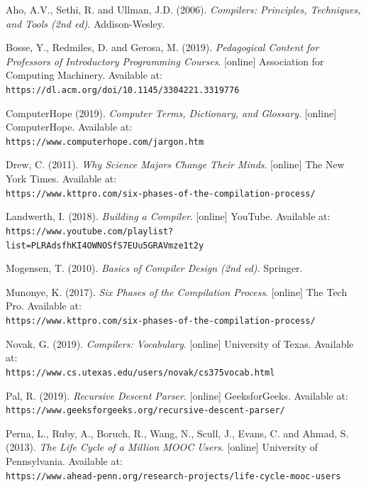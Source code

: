 \documentclass[
]{report}
\begin{document}
\begin{thebibliography}{9}
	Aho, A.V., Sethi, R. and Ullman, J.D. (2006).
	\textit{Compilers: Principles, Techniques, and Tools (2nd ed)}. 
	Addison-Wesley.
	
	Bosse, Y., Redmiles, D. and Gerosa, M. (2019).
	\textit{Pedagogical Content for Professors of Introductory Programming Courses}.
	[online] Association for Computing Machinery. Available at:
	\\\texttt{https://dl.acm.org/doi/10.1145/3304221.3319776}
	
	ComputerHope (2019).
	\textit{Computer Terms, Dictionary, and Glossary}.
	[online] ComputerHope. Available at:
	\\\texttt{https://www.computerhope.com/jargon.htm}
	
	Drew, C. (2011).
	\textit{Why Science Majors Change Their Minds}.
	[online] The New York Times. Available at:
	\\\texttt{https://www.kttpro.com/six-phases-of-the-compilation-process/}
	
	Landwerth, I. (2018).
	\textit{Building a Compiler}.
	[online] YouTube. Available at:
	\\\texttt{https://www.youtube.com/playlist?list=PLRAdsfhKI4OWNOSfS7EUu5GRAVmze1t2y}
	
	Mogensen, T. (2010).
	\textit{Basics of Compiler Design (2nd ed)}.
	Springer.
	
	Munonye, K. (2017).
	\textit{Six Phases of the Compilation Process}.
	[online] The Tech Pro. Available at:
	\\\texttt{https://www.kttpro.com/six-phases-of-the-compilation-process/}
	
	Novak, G. (2019).
	\textit{Compilers: Vocabulary}.
	[online] University of Texas. Available at:
	\\\texttt{https://www.cs.utexas.edu/users/novak/cs375vocab.html}
	
	Pal, R. (2019).
	\textit{Recursive Descent Parser}.
	[online] GeeksforGeeks. Available at:
	\\\texttt{https://www.geeksforgeeks.org/recursive-descent-parser/}
	
	Perna, L., Ruby, A., Boruch, R., Wang, N., Scull, J., Evans, C. and Ahmad, S. (2013).
	\textit{The Life Cycle of a Million MOOC Users}.
	[online] University of Pennsylvania. Available at:
	\\\texttt{https://www.ahead-penn.org/research-projects/life-cycle-mooc-users}
	

\end{thebibliography}
\end{document}
